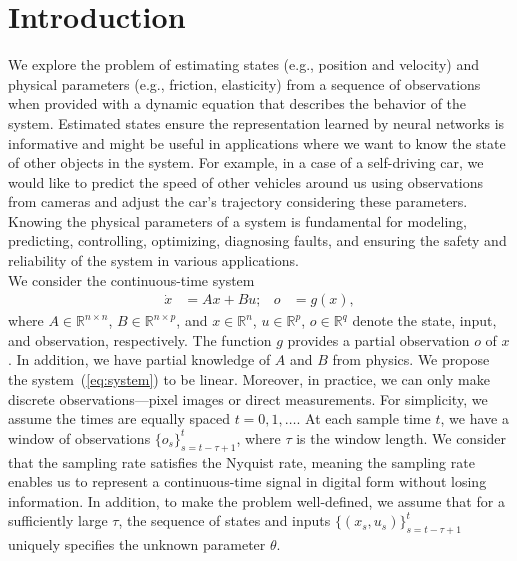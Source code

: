 \documentclass[acmtog]{techreportacmart}
\begin{document}
\section{Introduction} %
We explore the problem of estimating states (e.g., position and velocity) and physical parameters (e.g., friction, elasticity) from a sequence of observations when provided with a dynamic equation that describes the behavior of the system. Estimated states ensure the representation learned by neural networks is informative and might be useful in applications where we want to know the state of other objects in the system. For example, in a case of a self-driving car, we would like to predict the speed of other vehicles around us using observations from cameras and adjust the car's trajectory considering these parameters. Knowing the physical parameters of a system is fundamental for modeling, predicting, controlling, optimizing, diagnosing faults, and ensuring the safety and reliability of the system in various applications.
\\
We consider the continuous-time system
\begin{align}
  \label{eq:system}
  \dot{x} &= Ax + Bu; & o &= g(x),
\end{align}
where $A \in \mathbb{R}^{n \times n}$, $B \in \mathbb{R}^{n \times p}$, and $x \in \mathbb{R}^n$, $u \in \mathbb{R}^p$, $o \in \mathbb{R}^q$ denote the state, input, and observation, respectively. The function $g$ provides a partial observation $o$ of $x$. In addition, we have partial knowledge of $A$ and $B$ from physics. We propose the system~(\ref{eq:system}) to be linear. Moreover, in practice, we can only make discrete observations—pixel images or direct measurements. For simplicity, we assume the times are equally spaced $t = 0, 1, \ldots$. At each sample time $t$, we have a window of observations $\{o_s\}_{s=t-\tau+1}^t$, where $\tau$ is the window length. We consider that the sampling rate satisfies the Nyquist rate, meaning the sampling rate enables us to represent a continuous-time signal in digital form without losing information. In addition, to make the problem well-defined, we assume that for a sufficiently large $\tau$, the sequence of states and inputs $\{(x_s, u_s)\}_{s=t-\tau+1}^t$ uniquely specifies the unknown parameter $\theta$.
\end{document}
